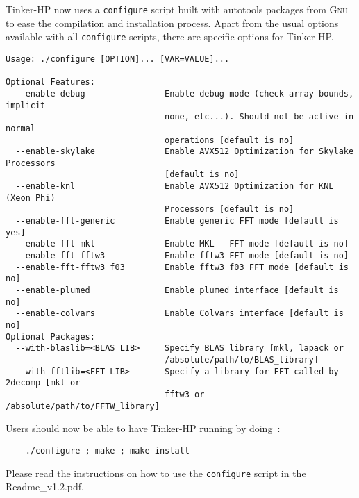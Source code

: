 \documentclass[]{article}
\begin{document}
Tinker-HP now uses a \texttt{configure} script built with  autotools packages from \textsc{Gnu} to ease the compilation and installation process. Apart from the usual options available with all \texttt{configure} scripts, there are specific options for Tinker-HP.


\begin{verbatim}
Usage: ./configure [OPTION]... [VAR=VALUE]...

Optional Features:
  --enable-debug                Enable debug mode (check array bounds, implicit
                                none, etc...). Should not be active in normal
                                operations [default is no]
  --enable-skylake              Enable AVX512 Optimization for Skylake Processors
                                [default is no]
  --enable-knl                  Enable AVX512 Optimization for KNL (Xeon Phi)
                                Processors [default is no]
  --enable-fft-generic          Enable generic FFT mode [default is yes]
  --enable-fft-mkl              Enable MKL   FFT mode [default is no]
  --enable-fft-fftw3            Enable fftw3 FFT mode [default is no]
  --enable-fft-fftw3_f03        Enable fftw3_f03 FFT mode [default is no]
  --enable-plumed               Enable plumed interface [default is no]
  --enable-colvars              Enable Colvars interface [default is no]
Optional Packages:
  --with-blaslib=<BLAS LIB>     Specify BLAS library [mkl, lapack or 
                                /absolute/path/to/BLAS_library]
  --with-fftlib=<FFT LIB>       Specify a library for FFT called by 2decomp [mkl or
                                fftw3 or /absolute/path/to/FFTW_library]
\end{verbatim}


Users should now be able to have Tinker-HP running by doing~:
\begin{verbatim}
    ./configure ; make ; make install
\end{verbatim}

Please read the instructions on how to use the \texttt{configure} script in the Readme\_v1.2.pdf.
\end{document}
